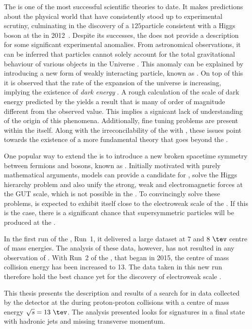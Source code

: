The \SM is one of the most successful scientific theories to date. It
makes predictions about the physical world that have consistently
stood up to experimental scrutiny, culminating in the discovery of a
$125$\gev particle consistent with a Higgs boson at the \LHC in
2012~\cite{1207.7214,1207.7235}.  Despite its successes, the \SM does
not provide a description for some significant experimental anomalies.
From astronomical observations, it can be inferred that \SM particles
cannot solely account for the total gravitational behaviour of various
objects in the Universe
\cite{Kapteyn:1922zz,Oort:436532,Markevitch:2003at,2012Natur.487..202D,Ade:2015xua,0067-0049-180-2-225}.
This anomaly can be explained by introducing a new form of weakly
interacting particle, known as \emph{\DM}. On top of this it is
observed that the rate of the expansion of the universe is increasing,
implying the existence of \emph{dark energy}
\cite{Weinberg:1988cp,Riess:1998cb}.  A rough calculation of the scale
of dark energy predicted by the \SM yields a result that is many of
order of magnitude different from the observed value.  This implies a
signicant lack of understanding of the origin of this phenomena.
Additionally, fine tuning problems are present within the \SM itself.
Along with the irreconcilability of the \SM with \GR, these issues
point towards the existence of a more fundamental theory 
that goes beyond the \SM. 

One popular way to extend the \SM is to introduce a new broken
spacetime symmetry between fermions and bosons, known as \SUSY
\cite{Martin:1997ns}.  Initially motivated with purely mathematical
arguments, \SUSY models can provide a candidate for \DM, solve the
Higgs hierarchy problem and also unify the strong, weak and
electromagnetic forces at the \ac{GUT} scale, which is not possible
in the \SM. To convincingly solve these problems, \SUSY is expected to
exhibit itself close to the electroweak scale of the \SM. If this is
the case, there is a significant chance that supersymmetric particles
will be produced at the \LHC. %

In the first run of the \LHC, Run~1, it delivered a large dataset at
$7$ and $8~\tev$ centre of mass energies. The analysis of these data,
however, has not resulted in any observation of \SUSY. With Run~2 of
the \LHC, that began in 2015, the centre of mass collision energy has
been increased to 13\tev. The data taken in this new run therefore
hold the best chance yet for the discovery of electroweak scale \SUSY.

This thesis presents the description and results of a search for \SUSY
in data collected by the \CMS detector at the \LHC during
proton-proton collisions with a centre of mass energy $\sqrt{s} =
13~\tev$.  The analysis presented looks for \SUSY signatures in a
final state with hadronic jets and missing transverse momentum. 

